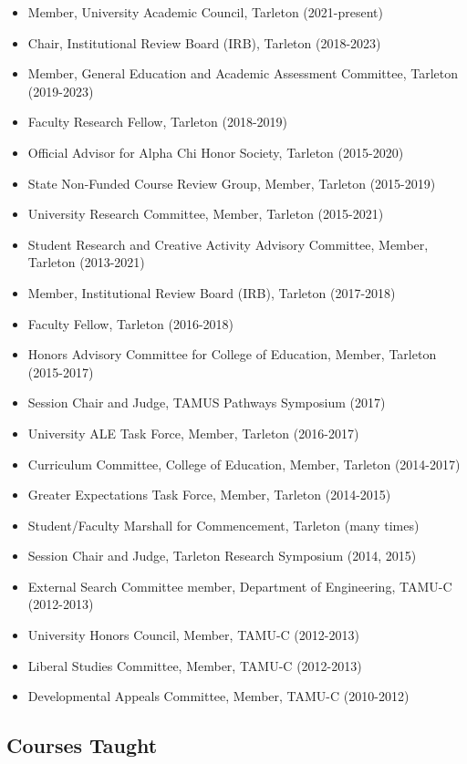 \documentclass[article,10pt]{article}
\begin{document}
\begin{itemize}
\item Member, University Academic Council, Tarleton (2021-present)
\item Chair, Institutional Review Board (IRB), Tarleton (2018-2023)
\item Member, General Education and Academic Assessment Committee, Tarleton (2019-2023)
\item Faculty Research Fellow, Tarleton (2018-2019)
\item Official Advisor for Alpha Chi Honor Society, Tarleton (2015-2020)
\item State Non-Funded Course Review Group, Member, Tarleton (2015-2019)
\item University Research Committee, Member, Tarleton (2015-2021)
\item Student Research and Creative Activity Advisory Committee, Member, Tarleton (2013-2021)
\item Member, Institutional Review Board (IRB), Tarleton (2017-2018)
\item Faculty Fellow, Tarleton (2016-2018)
\item Honors Advisory Committee for College of Education, Member, Tarleton (2015-2017)
\item Session Chair and Judge, TAMUS Pathways Symposium (2017)
\item University ALE Task Force, Member, Tarleton (2016-2017)
\item Curriculum Committee, College of Education, Member, Tarleton (2014-2017)
\item Greater Expectations Task Force, Member, Tarleton (2014-2015)
\item Student/Faculty Marshall for Commencement, Tarleton (many times)
\item Session Chair and Judge, Tarleton Research Symposium (2014, 2015)
\item External Search Committee member, Department of Engineering, TAMU-C (2012-2013)
\item University Honors Council, Member, TAMU-C (2012-2013)
\item Liberal Studies Committee, Member, TAMU-C (2012-2013)
\item Developmental Appeals Committee, Member, TAMU-C (2010-2012)
\end{itemize}

\subsection*{Courses Taught}
\label{sec:orgbaa0e95}
\end{document}
